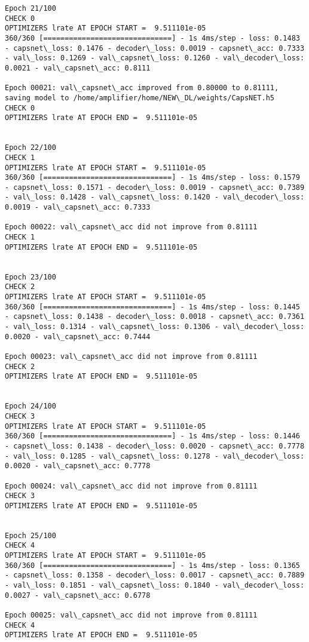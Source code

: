 \documentclass[11pt]{article}
\begin{document}
\begin{Verbatim}[commandchars=\\\{\}]
Epoch 21/100
CHECK 0
OPTIMIZERS lrate AT EPOCH START =  9.511101e-05
360/360 [==============================] - 1s 4ms/step - loss: 0.1483 - capsnet\_loss: 0.1476 - decoder\_loss: 0.0019 - capsnet\_acc: 0.7333 - val\_loss: 0.1269 - val\_capsnet\_loss: 0.1260 - val\_decoder\_loss: 0.0021 - val\_capsnet\_acc: 0.8111

Epoch 00021: val\_capsnet\_acc improved from 0.80000 to 0.81111, saving model to /home/amplifier/home/NEW\_DL/weights/CapsNET.h5
CHECK 0
OPTIMIZERS lrate AT EPOCH END =  9.511101e-05 


Epoch 22/100
CHECK 1
OPTIMIZERS lrate AT EPOCH START =  9.511101e-05
360/360 [==============================] - 1s 4ms/step - loss: 0.1579 - capsnet\_loss: 0.1571 - decoder\_loss: 0.0019 - capsnet\_acc: 0.7389 - val\_loss: 0.1428 - val\_capsnet\_loss: 0.1420 - val\_decoder\_loss: 0.0019 - val\_capsnet\_acc: 0.7333

Epoch 00022: val\_capsnet\_acc did not improve from 0.81111
CHECK 1
OPTIMIZERS lrate AT EPOCH END =  9.511101e-05 


Epoch 23/100
CHECK 2
OPTIMIZERS lrate AT EPOCH START =  9.511101e-05
360/360 [==============================] - 1s 4ms/step - loss: 0.1445 - capsnet\_loss: 0.1438 - decoder\_loss: 0.0018 - capsnet\_acc: 0.7361 - val\_loss: 0.1314 - val\_capsnet\_loss: 0.1306 - val\_decoder\_loss: 0.0020 - val\_capsnet\_acc: 0.7444

Epoch 00023: val\_capsnet\_acc did not improve from 0.81111
CHECK 2
OPTIMIZERS lrate AT EPOCH END =  9.511101e-05 


Epoch 24/100
CHECK 3
OPTIMIZERS lrate AT EPOCH START =  9.511101e-05
360/360 [==============================] - 1s 4ms/step - loss: 0.1446 - capsnet\_loss: 0.1438 - decoder\_loss: 0.0020 - capsnet\_acc: 0.7778 - val\_loss: 0.1285 - val\_capsnet\_loss: 0.1278 - val\_decoder\_loss: 0.0020 - val\_capsnet\_acc: 0.7778

Epoch 00024: val\_capsnet\_acc did not improve from 0.81111
CHECK 3
OPTIMIZERS lrate AT EPOCH END =  9.511101e-05 


Epoch 25/100
CHECK 4
OPTIMIZERS lrate AT EPOCH START =  9.511101e-05
360/360 [==============================] - 1s 4ms/step - loss: 0.1365 - capsnet\_loss: 0.1358 - decoder\_loss: 0.0017 - capsnet\_acc: 0.7889 - val\_loss: 0.1851 - val\_capsnet\_loss: 0.1840 - val\_decoder\_loss: 0.0027 - val\_capsnet\_acc: 0.6778

Epoch 00025: val\_capsnet\_acc did not improve from 0.81111
CHECK 4
OPTIMIZERS lrate AT EPOCH END =  9.511101e-05 



\end{Verbatim}
\end{document}
